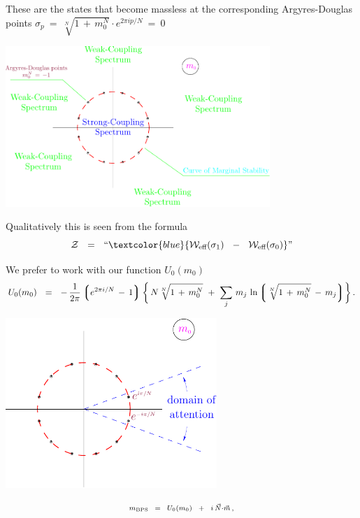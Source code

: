 \documentclass[12pt,letterpaper,landscape,KOMA,smallheadings,calcdimensions,display]{powersem}
\newcommand{\mbps}{m_{\text{\tiny BPS}}}
\newcommand{\W}{\mathcal{W}}
\begin{document}
\begin{slide}

These are the states that become massless at the corresponding Argyres-Douglas points
$ \sigma_p ~=~ 	\sqrt[N] { 1 \,+\, m_0^N } \cdot e^{ 2\pi i p / N } ~=~ 0 $

\begin{center}
\includegraphics[width=10.0cm]{mplane.pdf}
\end{center}

Qualitatively this is seen from the formula
\[
	\mc{Z} ~~=~~  \text{``} \textcolor{blue}{
\W_\text{eff} ( \sigma_1 ) ~~-~~ \W_\text{eff} ( \sigma_0 )} \text{''} 
\]

\end{slide}


\begin{slide}

We prefer to work with our function $ U_0(m_0) $
{\tiny
\[
%
\label{unod}
	U_0 (m_0) ~~=~~ -\, \frac{1}{2\pi} \lgr e^{2\pi i / N} \,-\, 1 \rgr 
	\biggl\{\, N \sqrt[N] { 1 \,+\, m_0^N }  ~+~ 
	\sum_j\, m_j\, \ln  \lgr \sqrt[N] {1 \,+\,  m_0^N } \,-\, m_j \rgr  \biggr\}\,.
\]
}
\begin{center}
\includegraphics[width=8.0cm]{domain.pdf}
\end{center}
\[
\scriptstyle
	\mbps ~~=~~ U_0 (m_0) ~~+~~ i\, \vec{N} \cdot \vec{m}\,,
\]

\end{slide}
\end{document}
